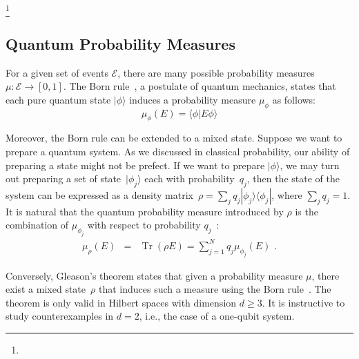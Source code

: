\documentclass{article}
\theoremstyle{remark}
\newcommand{\events}{\ensuremath{\mathcal{E}}}
\newcommand{\ket}[1]{|#1\rangle}
\newcommand{\ip}[2]{\langle #1 | #2 \rangle}
\newcommand{\proj}[1]{|#1 \rangle\langle #1 |}
\newcommand{\yutsung}[1]{\fbox{\begin{minipage}{0.9\textwidth}\color{purple}{Yu-Tsung says: #1}\end{minipage}}}
\newcommand{\Tr}{\mathop{\mathrm{Tr}}\nolimits}
\begin{document}
\footnote{\yutsung{The definition of independence is interesting, and we
definitely need to discuss it when we want to discuss Bell's theorem and the Kochen-Specker
theorem. However, the definition diverges. So we just leave it so far, and we
will go back if we really need it in this paper. (Maybe when discussing repeating
experiments?)}}

\subsection{Quantum Probability Measures}

For a given set of events $\events$, there are many possible probability
measures $\mu:\events\rightarrow[0,1]$. The Born rule~\cite{Born1983,Mermin2007,RiederSvozil2007},
a postulate of quantum mechanics, states that each pure quantum state
$\ket{\phi}$ induces a probability measure $\mu_{\phi}$ as follows:
\[
\mu_{\phi}(E)=\ip{\phi}{E\phi}
\]

Moreover, the Born rule can be extended to a mixed state. Suppose
we want to prepare a quantum system. As we discussed in classical
probability, our ability of preparing a state might not be prefect.
If we want to prepare $\ket{\phi}$, we may turn out preparing a set
of state~$\ket{\phi_{j}}$ each with probability~$q_{j}$, then
the state of the system can be expressed as a density matrix~$\rho=\sum_{j}q_{j}\proj{\phi_{j}}$,
where $\sum_{j}q_{j}=1$. It is natural that the quantum probability
measure introduced by $\rho$ is the combination of $\mu_{\phi_{j}}$
with respect to probability $q_{j}$~\cite{peres1995quantum,544199,RiederSvozil2007}:
\begin{eqnarray}
\mu_{\rho}\left(E\right) & = & \Tr\left(\rho E\right)=\sum_{j=1}^{N}q_{j}\mu_{\phi_{j}}\left(E\right)\textrm{ .}\label{BornRule.mixed}
\end{eqnarray}

Conversely, Gleason's theorem states that given a probability measure
$\mu$, there exist a mixed state~$\rho$ that induces such a measure
using the Born rule~\cite{gleason1957,Redhead1987-REDINA,peres1995quantum}.
The theorem is only valid in Hilbert spaces with dimension $d\geq3$.
It is instructive to study counterexamples in $d=2$, i.e., the case
of a one-qubit system.
\end{document}
